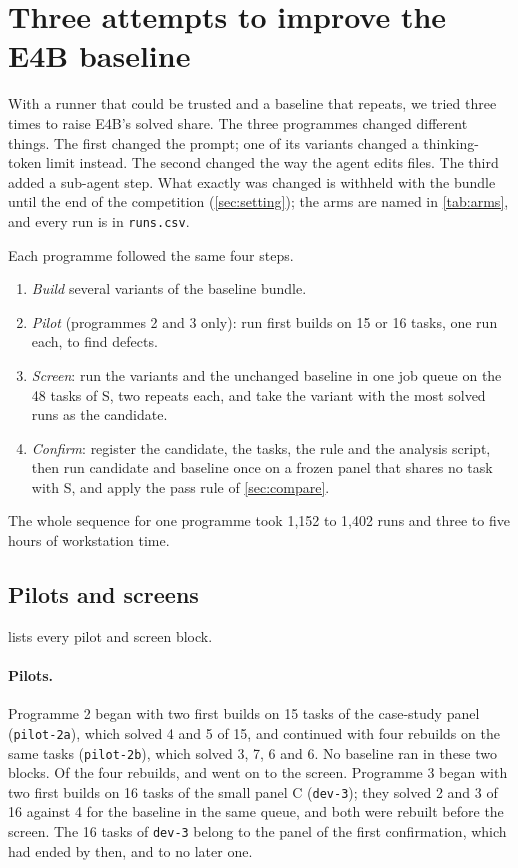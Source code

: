 \section{Three attempts to improve the E4B baseline}\label{sec:programmes}

With a runner that could be trusted and a baseline that repeats, we tried three times to raise E4B's solved share.
The three programmes changed different things. The first changed the prompt; one of its variants changed a
thinking-token limit instead. The second changed the way the agent edits files. The third added a sub-agent step. What
exactly was changed is withheld with the bundle until the end of the competition (\cref{sec:setting}); the arms are
named in \cref{tab:arms}, and every run is in \texttt{runs.csv}.

Each programme followed the same four steps.
\begin{enumerate}[leftmargin=*,itemsep=1pt,topsep=2pt]
\item \emph{Build} several variants of the baseline bundle.
\item \emph{Pilot} (programmes 2 and 3 only): run first builds on 15 or 16 tasks, one run each, to find defects.
\item \emph{Screen}: run the variants and the unchanged baseline in one job queue on the 48 tasks of S, two repeats
each, and take the variant with the most solved runs as the candidate.
\item \emph{Confirm}: register the candidate, the tasks, the rule and the analysis script, then run candidate and
baseline once on a frozen panel that shares no task with S, and apply the pass rule of \cref{sec:compare}.
\end{enumerate}
The whole sequence for one programme took 1,152 to 1,402 runs and three to five hours of workstation time.

\subsection{Pilots and screens}\label{sec:screens}



 lists every pilot and screen block.

\paragraph{Pilots.}
Programme 2 began with two first builds on 15 tasks of the case-study panel (\texttt{pilot-2a}), which solved 4 and
5 of 15, and continued with four rebuilds on the same tasks (\texttt{pilot-2b}), which solved 3, 7, 6 and 6. No
baseline ran in these two blocks. Of the four rebuilds,  and  went on to the screen. Programme 3
began with two first builds on 16 tasks of the small panel C (\texttt{dev-3}); they solved 2 and 3 of 16 against 4
for the baseline in the same queue, and both were rebuilt before the screen. The 16 tasks of \texttt{dev-3} belong to
the panel of the first confirmation, which had ended by then, and to no later one.

